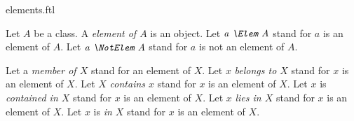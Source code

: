 \documentclass{stex}
\begin{document}
\begin{smodule}{elements.ftl}



\begin{fakeforthel}
  \begin{signature}[for={element,Elem,NotElem}]
    Let $A$ be a class.
    A \emph{element of $A$} is an object.
    Let $\emph{a \Elem A}$ stand for $a$ is an element of $A$.
    Let $\emph{a \NotElem A}$ stand for $a$ is not an element of $A$.
  \end{signature}
\end{fakeforthel}

\begin{forthel}
  \begin{convention}[for={member,belong,contain,lie,in}]
    Let a \emph{member of $X$} stand for an element of $X$.
    Let $x$ \emph{belongs to $X$} stand for $x$ is an element of $X$.
    Let $X$ \emph{contains $x$} stand for $x$ is an element of $X$.
    Let $x$ is \emph{contained in $X$} stand for $x$ is an element of $X$.
    Let $x$ \emph{lies in $X$} stand for $x$ is an element of $X$.
    Let $x$ is \emph{in $X$} stand for $x$ is an element of $X$.
  \end{convention}
\end{forthel}

\end{smodule}
\end{document}
